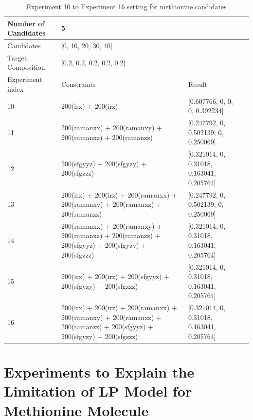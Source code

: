 \begin{table}\tiny \label{tab:4.3}
\begin{center}
\begin{tabular}{| l | p{3cm} | l | l |}
\hline
Number of Candidates & \multicolumn{2}{l|}{5} \\ \hline
Candidates & \multicolumn{2}{l|}{[0, 10, 20, 30, 40]} \\ \hline
Target Composition & \multicolumn{2}{l|}{[0.2, 0.2, 0.2, 0.2, 0.2]} \\ \hline
Experiment index & Constraints & Result  \\ \hline
10 & 200(irx) + 200(irz)  & [0.607766, 0, 0, 0, 0.392234]  \\ \hline
11 & 200(ramanxx) + 200(ramanxy) + 200(ramanxz) + 200(ramanzz)  & [0.247792, 0, 0.502139, 0, 0.250069]  \\ \hline
12 & 200(sfgyyz) + 200(sfgyzy) + 200(sfgzzz) & [0.321014, 0, 0.31018, 0.163041, 0.205764]  \\ \hline
13 & 200(irx) + 200(irz) + 200(ramanxx) + 200(ramanxy) + 200(ramanxz) + 200(ramanzz) & [0.247792, 0, 0.502139, 0, 0.250069]  \\ \hline
14 & 200(ramanxx) + 200(ramanxy) + 200(ramanxz) + 200(ramanzz) + 200(sfgyyz) + 200(sfgyzy) + 200(sfgzzz) & [0.321014, 0, 0.31018, 0.163041, 0.205764]  \\ \hline
15 & 200(irx) + 200(irz) + 200(sfgyyz) + 200(sfgyzy) + 200(sfgzzz) & [0.321014, 0, 0.31018, 0.163041, 0.205764]  \\ \hline
16 & 200(irx) + 200(irz) + 200(ramanxx) + 200(ramanxy) + 200(ramanxz) + 200(ramanzz) + 200(sfgyyz) + 200(sfgyzy) + 200(sfgzzz) & [0.321014, 0, 0.31018, 0.163041, 0.205764]  \\ \hline
\end{tabular} 
\end{center}
\caption{Experiment 10 to Experiment 16 setting for methionine candidates}
\end{table}

\section{Experiments to Explain the Limitation of LP Model for Methionine Molecule}

